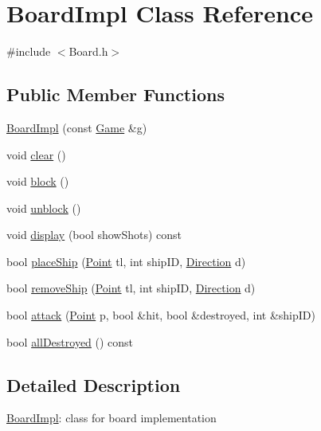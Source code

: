 \hypertarget{class_board_impl}{}\section{Board\+Impl Class Reference}
\label{class_board_impl}


{\ttfamily \#include $<$Board.\+h$>$}

\subsection*{Public Member Functions}
\begin{DoxyCompactItemize}
\item 
\mbox{\hyperlink{class_board_impl_a2c3f1cce7def17781c0025d1e68d0af5}{Board\+Impl}} (const \mbox{\hyperlink{class_game}{Game}} \&g)
\item 
void \mbox{\hyperlink{class_board_impl_a47c7733ed5ec7a09fe9710f443fe0952}{clear}} ()
\item 
void \mbox{\hyperlink{class_board_impl_abd7743ed758876c2855b2bb7474cf2eb}{block}} ()
\item 
void \mbox{\hyperlink{class_board_impl_a36defeb0096154a4606442da9122c810}{unblock}} ()
\item 
void \mbox{\hyperlink{class_board_impl_a4b600b257cfe79f10ac8792ab69eb388}{display}} (bool show\+Shots) const
\item 
bool \mbox{\hyperlink{class_board_impl_af0fd0226fc1f401374a0cbbfbab98769}{place\+Ship}} (\mbox{\hyperlink{class_point}{Point}} tl, int ship\+ID, \mbox{\hyperlink{_globals_8h_a224b9163917ac32fc95a60d8c1eec3aa}{Direction}} d)
\item 
bool \mbox{\hyperlink{class_board_impl_a8573ccd5fb2a837f324cc0f190cece5d}{remove\+Ship}} (\mbox{\hyperlink{class_point}{Point}} tl, int ship\+ID, \mbox{\hyperlink{_globals_8h_a224b9163917ac32fc95a60d8c1eec3aa}{Direction}} d)
\item 
bool \mbox{\hyperlink{class_board_impl_afd58266f5c81679fef78c0d1abb9d0d5}{attack}} (\mbox{\hyperlink{class_point}{Point}} p, bool \&hit, bool \&destroyed, int \&ship\+ID)
\item 
bool \mbox{\hyperlink{class_board_impl_a00ae397df7ab1a47868078a2e0ec54b8}{all\+Destroyed}} () const
\end{DoxyCompactItemize}


\subsection{Detailed Description}
\mbox{\hyperlink{class_board_impl}{Board\+Impl}}\+: class for board implementation 

